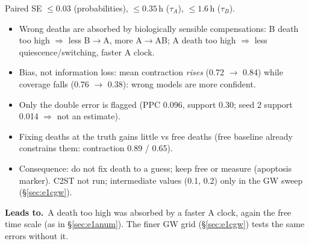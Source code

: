 \documentclass[10pt,a4paper]{article}
\newcommand{\tA}{$\tau_A$}
\newcommand{\tB}{$\tau_B$}
\newcommand{\blk}[1]{\par\needspace{5\baselineskip}\smallskip{\sffamily\bfseries\color{inkgray}#1}\par}
\newcommand{\Comment}{\blk{Comment}}
\newcommand{\Leads}[1]{\begin{leadbox}{\sffamily\bfseries\color{caqua!70!black}Leads to.}\ #1\end{leadbox}}
\renewcommand{\blk}[1]{\par\Needspace*{5\baselineskip}\smallskip{\sffamily\bfseries\color{inkgray}#1}\par}
\newcommand{\sref}[1]{\S\ref{#1}}
\begin{document}
Paired SE $\le 0.03$ (probabilities), $\le 0.35$\,h (\tA), $\le 1.6$\,h (\tB).
\Comment
\begin{itemize}
\item Wrong deaths are absorbed by biologically sensible compensations: B death too high $\Rightarrow$ less B$\to$A, more A$\to$AB; A death too high $\Rightarrow$ less quiescence/switching, faster A clock.
\item Bias, not information loss: mean contraction \emph{rises} (0.72 $\to$ 0.84) while coverage falls (0.76 $\to$ 0.38): wrong models are more confident.
\item Only the double error is flagged (PPC 0.096, support 0.30; seed 2 support 0.014 $\Rightarrow$ not an estimate).
\item Fixing deaths at the truth gains little vs free deaths (free baseline already constrains them: contraction 0.89 / 0.65).
\item Consequence: do not fix death to a guess; keep free or measure (apoptosis marker). C2ST not run; intermediate values (0.1, 0.2) only in the GW sweep (\S\ref{sec:e1cgw}).
\end{itemize}
\Leads{A death too high was absorbed by a faster A clock, again the free time scale (as in \sref{sec:e1anum}). The finer GW grid (\sref{sec:e1cgw}) tests the same errors without it.}
\end{document}
